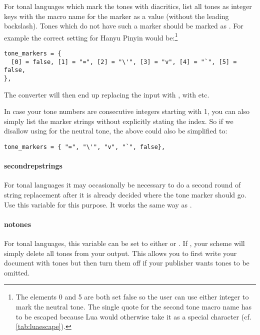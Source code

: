 \documentclass{ltxdockit}
\begin{document}
For tonal languages which mark the tones with diacritics, list all tones as
integer keys with the macro name for the marker as a value (without the
leading backslash). Tones which do not have such a marker should be marked as
. For example the correct setting for Hanyu Pinyin would
be:\footnote{The elements 0 and 5 are both set false so the user can use either
integer to mark the neutral tone. The single quote for the second tone macro
name has to be escaped because Lua would otherwise take it as a special
character (cf. \autoref{tab:luaescape}).}

\begin{lstlisting}
tone_markers = {
  [0] = false, [1] = "=", [2] = "\'", [3] = "v", [4] = "`", [5] = false,
},
\end{lstlisting}

The converter will then end up replacing the input  with
,  with  etc.

In case your tone numbers are consecutive integers starting with 1, you can also
simply list the marker strings without explicitly stating the index. So if we
disallow using  for the neutral tone, the above could also be simplified
to:

\begin{lstlisting}
tone_markers = { "=", "\'", "v", "`", false},
\end{lstlisting}

\paragraph{second\textunderscore{}rep\textunderscore{}strings}

For tonal languages it may occasionally be necessary to do a second round of
string replacement after it is already decided where the tone marker should go.
Use this variable for this purpose. It works the same way as
.

\paragraph{no\textunderscore{}tones}

For tonal languages, this variable can be set to either  or
. If , your scheme will simply delete all tones from your
output. This allows you to first write your document with tones but then turn
them off if your publisher wants tones to be omitted.
\end{document}
